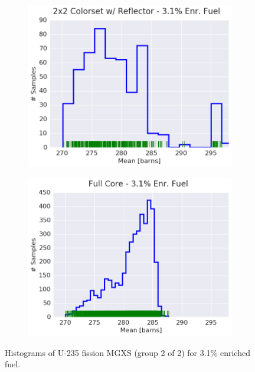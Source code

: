\begin{figure}[h!]
\begin{subfigure}{0.5\textwidth}
  \centering
  \includegraphics[width=\linewidth]{figures/patterns/reflector/hist-kde-rug/31-enr-fiss-2}  \caption{}
  \label{fig:chap9-hist-reflector-3.1-fiss}
\end{subfigure}%
\begin{subfigure}{0.5\textwidth}
  \centering
  \includegraphics[width=\linewidth]{figures/patterns/full-core/hist-kde-rug/31-enr-fiss-2} \caption{}
  \label{fig:chap9-hist-full-core-3.1-fiss}
\end{subfigure}
\caption[Histogram of U-235 fission MGXS 3.1\% enriched fuel]{Histograms of U-235 fission \ac{MGXS} (group 2 of 2) for 3.1\% enriched fuel.}
\label{fig:chap9-hist-3.1-fiss}
\end{figure}

